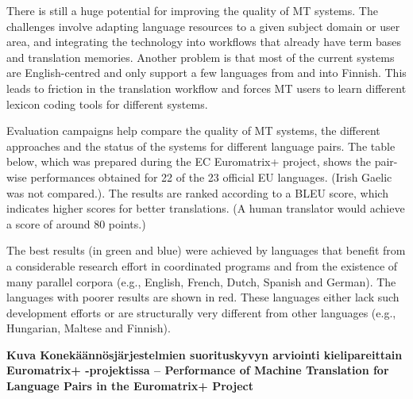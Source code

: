 \documentclass[]{../../metanetpaper}
\begin{document}
\begin{Parallel}[c]{77mm}{77mm}
{There is still a huge potential for improving the quality of MT
systems. The challenges involve adapting language resources to a given
subject domain or user area, and integrating the technology into
workflows that already have term bases and translation
memories. Another problem is that most of the current systems are
English-centred and only support a few languages from and into
Finnish. This leads to friction in the translation workflow and forces
MT users to learn different lexicon coding tools for different
systems.

Evaluation campaigns help compare the quality of MT systems, the
different approaches and the status of the systems for different
language pairs. The table below, which was prepared during the EC
Euromatrix+ project, shows the pair-wise performances obtained for 22
of the 23 official EU languages. (Irish Gaelic was not compared.). The
results are ranked according to a BLEU score, which indicates higher
scores for better translations.\cite{BLEU} (A human translator would
achieve a score of around 80 points.)

The best results (in green and blue) were achieved by languages that
benefit from a considerable research effort in coordinated programs
and from the existence of many parallel corpora (e.g., English,
French, Dutch, Spanish and German). The languages with poorer results
are shown in red. These languages either lack such development efforts
or are structurally very different from other languages (e.g.,
Hungarian, Maltese and Finnish).



}

\ParallelPar


\textbf{Kuva Konekäännösjärjestelmien suorituskyvyn arviointi kielipareittain Euromatrix+ -projektissa -- Performance of Machine Translation for Language Pairs in the Euromatrix+
Project}



\end{Parallel}
\end{document}
